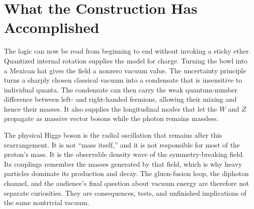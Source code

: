 \begin{classroomqa}
\end{classroomqa}

\begin{classroomqa}
\end{classroomqa}

\section{What the Construction Has Accomplished}

The logic can now be read from beginning to end without invoking a sticky ether. Quantized internal rotation supplies the model for charge. Turning the bowl into a Mexican hat gives the field a nonzero vacuum value. The uncertainty principle turns a sharply chosen classical vacuum into a condensate that is insensitive to individual quanta. The condensate can then carry the weak quantum-number difference between left- and right-handed fermions, allowing their mixing and hence their masses. It also supplies the longitudinal modes that let the $W$ and $Z$ propagate as massive vector bosons while the photon remains massless.

The physical Higgs boson is the radial oscillation that remains after this rearrangement. It is not ``mass itself,'' and it is not responsible for most of the proton's mass. It is the observable density wave of the symmetry-breaking field. Its couplings remember the masses generated by that field, which is why heavy particles dominate its production and decay. The gluon-fusion loop, the diphoton channel, and the audience's final question about vacuum energy are therefore not separate curiosities. They are consequences, tests, and unfinished implications of the same nontrivial vacuum.
